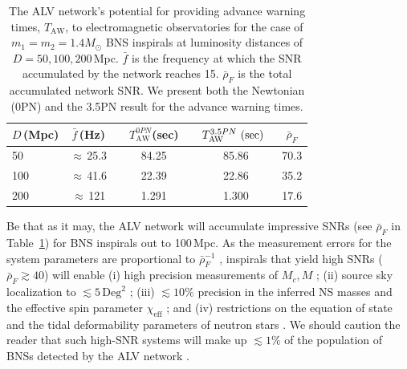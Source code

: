 \documentclass[prd,amsmath,amssymb,aps,floats,amsfonts,notitlepage,superscriptaddress,eqsecnum,nofootinbib,10pt]{revtex4-1}
\newcommand\T{\rule{0pt}{2.6ex}}       %
\newcommand\B{\rule[-1.2ex]{0pt}{0pt}} %
\begin{document}
\begin{table}[h]
\centering
\begin{tabular}{lcccccc}
\hline\hline
$D\,$(Mpc) & $\bar{f}\,$(Hz) &{}& $T^{0PN}_\text{AW}$(sec) &\hspace{1mm} & $T^{3.5PN}_\text{AW}\text{ (sec)}\hspace{2mm}$& $\bar{\rho}_F$\T\B\\
\hline
50 & $\approx\,$25.3 & & 84.25 & & 85.86 & 70.3 \T\\
100 & $\approx\,$41.6 & & 22.39 & & 22.86 & 35.2 \\
200 & $\approx\,$121 & & 1.291 &\quad & 1.300 & 17.6 \\
\hline\hline
\end{tabular}
\caption{The ALV network's potential for providing advance warning times, $T_\text{AW}$, 
to electromagnetic observatories for the case of $m_1=m_2=1.4 M_\odot$ BNS inspirals at luminosity distances of $D=50,100,200\,$Mpc. 
$\bar{f}$ is the frequency at which the  %
SNR accumulated by the network reaches 15. 
$\bar{\rho}_F$ is the total accumulated network SNR. %
We present both the Newtonian (0PN) 
and the 3.5PN result for the advance warning times.}\label{table:LIGO2020}
\end{table}
%
%
Be that as it may,
the ALV network will accumulate impressive SNRs 
(see $\bar{\rho}_F$ in Table~\ref{table:LIGO2020}) for BNS inspirals out to 100\,Mpc.
As the measurement errors for the system parameters are proportional to $\bar\rho^{-1}_F$ \cite{Cutler:1994ys},
inspirals that yield high SNRs ($\bar\rho_F\gtrsim 40$) will enable (i) high precision measurements of 
$M_c, M$ \cite{Farr:2015lna}; (ii) source sky localization to $\lesssim 5\,\text{Deg}^2$ \cite{Rodriguez:2013oaa};
(iii) $ \lesssim 10\%$ precision in the inferred NS masses \cite{Rodriguez:2013oaa} and the effective spin parameter $\chi_\text{eff}$ \cite{Zhu:2017znf}; and
(iv) restrictions on the equation of state and the tidal deformability
parameters of neutron stars \cite{Read:2009yp, Andersson:2009yt, PhysRevD.89.103012, PhysRevD.91.043002}.
We should caution the reader that such high-SNR systems will make up $\lesssim 1\%$ of the population of BNSs detected by 
the ALV network \cite{Sathyaprakash:2012jk}.
\end{document}
